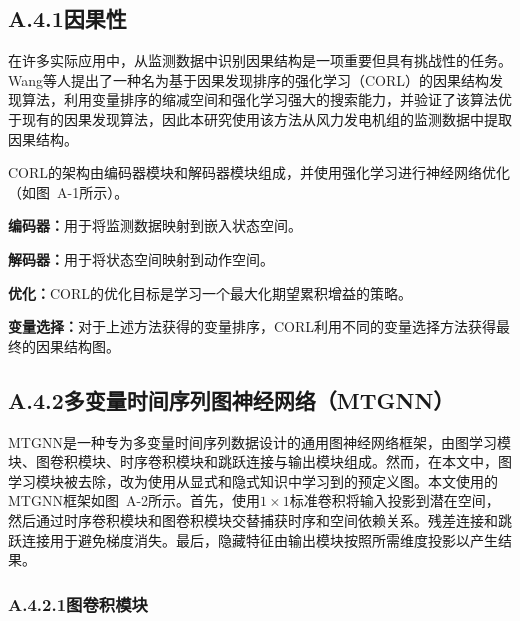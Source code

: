 \subsection*{A.4.1\quad 因果性}

在许多实际应用中，从监测数据中识别因果结构是一项重要但具有挑战性的任务。Wang等人提出了一种名为基于因果发现排序的强化学习（CORL）的因果结构发现算法，利用变量排序的缩减空间和强化学习强大的搜索能力，并验证了该算法优于现有的因果发现算法，因此本研究使用该方法从风力发电机组的监测数据中提取因果结构。

CORL的架构由编码器模块和解码器模块组成，并使用强化学习进行神经网络优化（如图~A-1所示）。

\textbf{编码器：}用于将监测数据映射到嵌入状态空间。

\textbf{解码器：}用于将状态空间映射到动作空间。

\textbf{优化：}CORL的优化目标是学习一个最大化期望累积增益的策略。

\textbf{变量选择：}对于上述方法获得的变量排序，CORL利用不同的变量选择方法获得最终的因果结构图。


\subsection*{A.4.2\quad 多变量时间序列图神经网络（MTGNN）}

MTGNN是一种专为多变量时间序列数据设计的通用图神经网络框架，由图学习模块、图卷积模块、时序卷积模块和跳跃连接与输出模块组成。然而，在本文中，图学习模块被去除，改为使用从显式和隐式知识中学习到的预定义图。本文使用的MTGNN框架如图~A-2所示。首先，使用$1 \times 1$标准卷积将输入投影到潜在空间，然后通过时序卷积模块和图卷积模块交替捕获时序和空间依赖关系。残差连接和跳跃连接用于避免梯度消失。最后，隐藏特征由输出模块按照所需维度投影以产生结果。


\subsubsection*{A.4.2.1\quad 图卷积模块}

